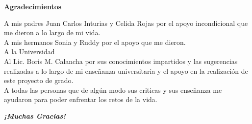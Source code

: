 \begin{titlepage}

\begin{center}
{\Large \textbf{Agradecimientos}}\\[2cm]
{\leftskip=8cm
A mis padres Juan Carlos Inturias y Celida Rojas por el apoyo incondicional que me dieron a lo largo de mi vida.\\
A mis hermanos Sonia y Ruddy por el apoyo que me dieron.\\
A la Universidad\\
Al Lic. Boris M. Calancha por sus conocimientos impartidos y las sugerencias realizadas a lo largo de mi enseñanza universitaria y el apoyo en la realización de este proyecto de grado.\\
A todas las personas que de algún modo sus criticas y sus enseñanza me ayudaron para poder enfrentar los retos de la vida.\\[3cm]
\par}
\textbf{\textit{¡Muchas Gracias!}}
\end{center}


\end{titlepage}